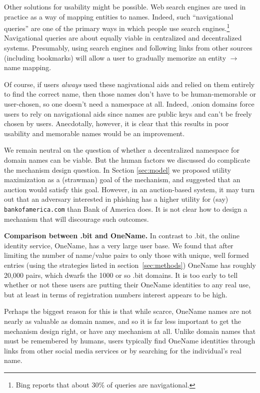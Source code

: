 Other solutions for usability might be possible. Web search engines are used in practice as a way of mapping entities to names. Indeed, such ``navigational queries'' are one of the primary ways in which people use search engines.\footnote{Bing reports that about 30\% of queries are navigational.} Navigational queries are about equally viable in centralized and decentralized systems. Presumably, using search engines and following links from other sources (including bookmarks) will allow a user to gradually memorize an entity $\rightarrow$ name mapping. 

Of course, if users {\em always} used these nagivational aids and relied on them entirely to find the correct name, then those names don't have to be human-memorable or user-chosen, so one doesn't need a namespace at all. Indeed, .onion domains force users to rely on navigational aids since names are public keys and can't be freely chosen by users. Anecdotally, however, it is clear that this results in poor usability and memorable names would be an improvement.

We remain neutral on the question of whether a decentralized namespace for domain names can be viable. But the human factors we discussed do complicate the mechanism design question. In Section \ref{sec:model} we proposed utility maximization as a (strawman) goal of the mechanism, and suggested that an auction would satisfy this goal. However, in an auction-based system, it may turn out that an adversary interested in phishing has a higher utility for (say) {\tt bankofamerica.com} than Bank of America does. It is not clear how to design a mechanism that will discourage such outcomes.

{\bf Comparison between .bit and OneName.} In contrast to .bit, the online identity service, OneName, has a very large user base. We found that after limiting the number of name/value pairs to only those with unique, well formed entries (using the strategies listed in section~\ref{sec:methods}) OneName has roughly 20,000 pairs, which dwarfs the 1000 or so .bit domains. It is too early to tell whether or not these users are putting their OneName identities to any real use, but at least in terms of registration numbers interest appears to be high.

Perhaps the biggest reason for this is that while scarce, OneName names are not nearly as valuable as domain names, and so it is far less important to get the mechanism design right, or have any mechanism at all. Unlike domain names that must be remembered by humans, users typically find OneName identities through links from other social media services or by searching for the individual's real name.

